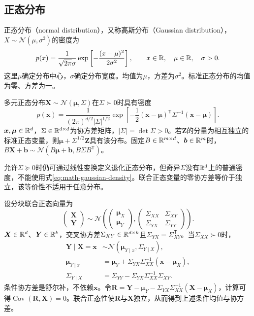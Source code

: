 \subsection{正态分布}
正态分布（normal distribution），又称高斯分布（Gaussian distribution），$X\sim\mathcal N(\mu,\sigma^2)$的密度为
\begin{equation}
 p(x)=\frac1{\sqrt{2\pi}\sigma}\exp\left[-\frac{(x-\mu)^2}{2\sigma^2}\right],
 \qquad x\in\mathbb{R},\quad\mu\in\mathbb{R},\quad\sigma>0.
\end{equation}
这里$\mu$确定分布中心，$\sigma$确定分布宽度。均值为$\mu$，方差为$\sigma^2$。标准正态分布的均值为零、方差为一。

多元正态分布$\bm X\sim\mathcal N(\bm\mu,\Sigma)$在$\Sigma\succ0$时具有密度
\begin{equation}
 p(\bm x)=\frac1{(2\pi)^{d/2}|\Sigma|^{1/2}}
 \exp\left[-\frac12(\bm x-\bm\mu)^{\mathsf T}\Sigma^{-1}(\bm x-\bm\mu)\right].
 \label{eq:math-gaussian-density}
\end{equation}
$\bm x,\bm\mu\in\mathbb{R}^d$，$\Sigma\in\mathbb{R}^{d\times d}$为协方差矩阵，$|\Sigma|=\det\Sigma>0$。若$\bm Z$的分量为相互独立的标准正态变量，则$\bm\mu+\Sigma^{1/2}\bm Z$具有该分布。固定$B\in\mathbb{R}^{m\times d}$、$\bm b\in\mathbb{R}^m$时，$B\bm X+\bm b\sim\mathcal N(B\bm\mu+\bm b,B\Sigma B^{\mathsf T})$。

允许$\Sigma\succeq0$时仍可通过线性变换定义退化正态分布，但奇异$\Sigma$没有$\mathbb{R}^d$上的普通密度，不能使用式\eqref{eq:math-gaussian-density}。联合正态变量的零协方差等价于独立，该等价性不适用于任意分布。

设分块联合正态向量为
\begin{equation}
 \begin{pmatrix}\bm X\\\bm Y\end{pmatrix}\sim\mathcal N\left(
 \begin{pmatrix}\bm\mu_X\\\bm\mu_Y\end{pmatrix},
 \begin{pmatrix}\Sigma_{XX}&\Sigma_{XY}\\\Sigma_{YX}&\Sigma_{YY}\end{pmatrix}\right).
\end{equation}
$\bm X\in\mathbb{R}^d$、$\bm Y\in\mathbb{R}^k$，交叉协方差$\Sigma_{XY}\in\mathbb{R}^{d\times k}$且$\Sigma_{YX}=\Sigma_{XY}^{\mathsf T}$。当$\Sigma_{XX}\succ0$时，
\begin{align}
 \bm Y\mid\bm X=\bm x&\sim\mathcal N(\bm\mu_{Y\mid x},\Sigma_{Y\mid X}),\\
 \bm\mu_{Y\mid x}&=\bm\mu_Y+\Sigma_{YX}\Sigma_{XX}^{-1}(\bm x-\bm\mu_X),\\
 \Sigma_{Y\mid X}&=\Sigma_{YY}-\Sigma_{YX}\Sigma_{XX}^{-1}\Sigma_{XY}.
\end{align}
条件协方差是舒尔补，不依赖$\bm x$。令$\bm R=\bm Y-\bm\mu_Y-\Sigma_{YX}\Sigma_{XX}^{-1}(\bm X-\bm\mu_X)$，计算可得$\operatorname{Cov}(\bm R,\bm X)=0$。联合正态性使$\bm R$与$\bm X$独立，从而得到上述条件均值与协方差。

